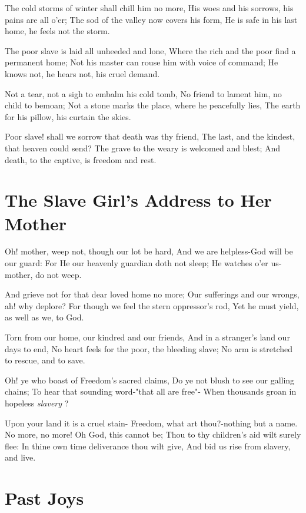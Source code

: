 \documentclass[11pt,a4paper]{article}
\begin{document}
The cold storms of winter shall chill him no more,
His woes and his sorrows, his pains are all o'er;
The sod of the valley now covers his form,
He is safe in his last home, he feels not the storm.

The poor slave is laid all unheeded and lone,
Where the rich and the poor find a permanent home;
Not his master can rouse him with voice of command;
He knows not, he hears not, his cruel demand.

Not a tear, not a sigh to embalm his cold tomb,
No friend to lament him, no child to bemoan;
Not a stone marks the place, where he peacefully lies,
The earth for his pillow, his curtain the skies.

Poor slave! shall we sorrow that death was thy friend,
The last, and the kindest, that heaven could send?
The grave to the weary is welcomed and blest;
And death, to the captive, is freedom and rest.

\section{The Slave Girl's Address to Her Mother}

Oh! mother, weep not, though our lot be hard,
And we are helpless-God will be our guard:
For He our heavenly guardian doth not sleep;
He watches o'er us-mother, do not weep.

And grieve not for that dear loved home no more;
Our sufferings and our wrongs, ah! why deplore?
For though we feel the stern oppressor's rod,
Yet he must yield, as well as we, to God.

Torn from our home, our kindred and our friends,
And in a stranger's land our days to end,
No heart feels for the poor, the bleeding slave;
No arm is stretched to rescue, and to save.

Oh! ye who boast of Freedom's sacred claims,
Do ye not blush to see our galling chains;
To hear that sounding word-"that all are free"-
When thousands groan in hopeless \textit{slavery} ?

Upon your land it is a cruel stain-
Freedom, what art thou?-nothing but a name.
No more, no more! Oh God, this cannot be;
Thou to thy children's aid wilt surely flee:
In thine own time deliverance thou wilt give,
And bid us rise from slavery, and live.

\section{Past Joys}
\end{document}
